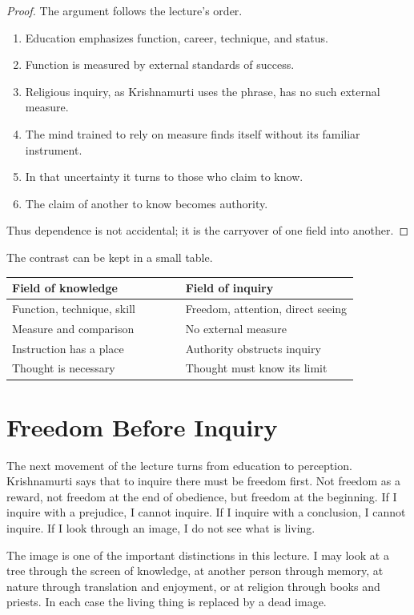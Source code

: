 \begin{proof}
The argument follows the lecture's order.
\begin{enumerate}
\item Education emphasizes function, career, technique, and status.
\item Function is measured by external standards of success.
\item Religious inquiry, as Krishnamurti uses the phrase, has no such external measure.
\item The mind trained to rely on measure finds itself without its familiar instrument.
\item In that uncertainty it turns to those who claim to know.
\item The claim of another to know becomes authority.
\end{enumerate}
Thus dependence is not accidental; it is the carryover of one field into another.
\end{proof}

The contrast can be kept in a small table.

\begin{table}
\centering
\begin{tabular}{p{0.43\linewidth} p{0.43\linewidth}}
Field of knowledge & Field of inquiry \\
\hline
Function, technique, skill & Freedom, attention, direct seeing \\
Measure and comparison & No external measure \\
Instruction has a place & Authority obstructs inquiry \\
Thought is necessary & Thought must know its limit \\
\end{tabular}
\end{table}

\section{Freedom Before Inquiry}

The next movement of the lecture turns from education to perception. Krishnamurti says that to inquire there must be freedom first. Not freedom as a reward, not freedom at the end of obedience, but freedom at the beginning. If I inquire with a prejudice, I cannot inquire. If I inquire with a conclusion, I cannot inquire. If I look through an image, I do not see what is living.

The image is one of the important distinctions in this lecture. I may look at a tree through the screen of knowledge, at another person through memory, at nature through translation and enjoyment, or at religion through books and priests. In each case the living thing is replaced by a dead image.

